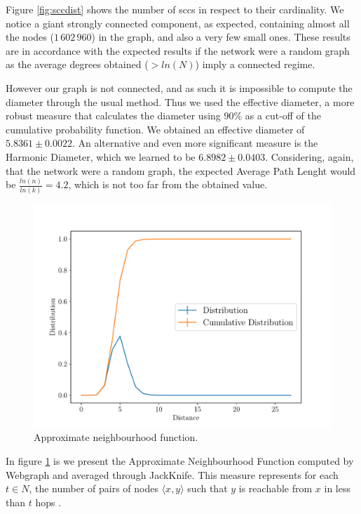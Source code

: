 \documentclass[9pt,a4paper,twocolumn]{article}
\begin{document}
Figure \ref{fig:sccdist} shows the number of \acrshort{scc}s in respect to their cardinality. We notice a giant strongly connected component, as expected, containing almost all the nodes ($1\,602\,960$) in the graph, and also a very few small ones. These results are in accordance with the expected results if the network were a random graph as the average degrees obtained ($> ln(N)$) imply a connected regime.

However our graph is not connected, and as such it is impossible to compute the diameter through the usual method. Thus we used the effective diameter, a more robust measure that calculates the diameter using $90\%$ as a cut-off of the cumulative probability function. We obtained an effective diameter of $5.8361 \pm 0.0022$. An alternative and even more significant measure is the Harmonic Diameter, which we learned to be $6.8982 \pm 0.0403$.
Considering, again, that the network were a random graph, the expected Average Path Lenght would be $\frac{ln(n)}{ln(k)} = 4.2$, which is not too far from the obtained value.

\begin{figure}[h]
	\centering
	\includegraphics[width=\linewidth]{wikipedia_pt_neighbourhood_function.pdf}
	\caption{Approximate neighbourhood function.}
	\label{fig:neighfun}
\end{figure}

In figure \ref{fig:neighfun} is we present the Approximate Neighbourhood Function computed by Webgraph and averaged through JackKnife. This measure represents for each $t \in N$, the number of pairs of nodes $ \langle x, y \rangle $ such that $y$ is reachable from $x$ in less than $t$ hops \cite{Boldi2011HyperANFAT}.
\end{document}
